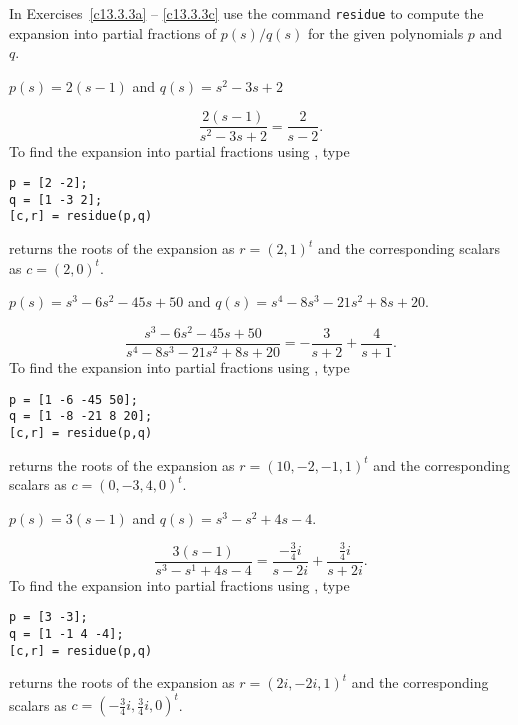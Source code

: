 \documentclass{ximera}
\begin{document}
\noindent In Exercises~\ref{c13.3.3a} -- \ref{c13.3.3c} use the \Matlab 
command {\tt residue}
to compute the expansion into partial fractions of 
$p(s)/q(s)$ for the given polynomials $p$ and $q$.
\begin{computerExercise} \label{c13.3.3a}
$p(s)=2(s-1)$ and $q(s)=s^2-3s+2$

\begin{solution}
\ans
\[
\frac{2(s - 1)}{s^2 - 3s + 2} = \frac{2}{s - 2}.
\]
\soln To find the expansion into partial fractions using \Matlabp, type
\begin{verbatim}
p = [2 -2];
q = [1 -3 2];
[c,r] = residue(p,q)
\end{verbatim}
\Matlab returns the roots of the expansion as $r = (2,1)^t$ and
the corresponding scalars as $c = (2,0)^t$.

\end{solution}
\end{computerExercise}
\begin{computerExercise} \label{c13.3.3b}
$p(s)=s^3-6s^2-45s+50$ and $q(s)=s^4-8s^3-21s^2+8s+20$.

\begin{solution}
\ans
\[
\frac{s^3 - 6s^2 - 45s + 50}{s^4 - 8s^3 - 21s^2 + 8s + 20}
= -\frac{3}{s + 2} + \frac{4}{s + 1}.
\]
\soln To find the expansion into partial fractions using \Matlabp, type
\begin{verbatim}
p = [1 -6 -45 50];
q = [1 -8 -21 8 20];
[c,r] = residue(p,q)
\end{verbatim}
\Matlab returns the roots of the expansion as $r = (10,-2,-1,1)^t$ and
the corresponding scalars as $c = (0,-3,4,0)^t$.

\end{solution}
\end{computerExercise}
\begin{computerExercise} \label{c13.3.3c}
$p(s)=3(s-1)$ and $q(s)=s^3-s^2+4s-4$.

\begin{solution}
\ans
\[
\frac{3(s - 1)}{s^3 - s^1 + 4s - 4} = \frac{-\frac{3}{4}i}{s - 2i}
+ \frac{\frac{3}{4}i}{s + 2i}.
\]
\soln To find the expansion into partial fractions using \Matlabp, type
\begin{verbatim}
p = [3 -3];
q = [1 -1 4 -4];
[c,r] = residue(p,q)
\end{verbatim}

\Matlab returns the roots of the expansion as $r = (2i,-2i,1)^t$ and
the corresponding scalars as $c = (-\frac{3}{4}i,\frac{3}{4}i,0)^t$.

\end{solution}
\end{computerExercise}
\end{document}
